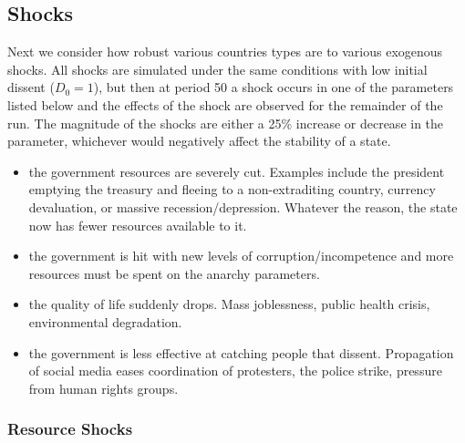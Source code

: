 \documentclass[12pt]{article}
\begin{document}
\begin{spacing}{1.5}

\subsection{Shocks}


Next we consider how robust various countries types are to various exogenous shocks. All shocks are simulated under the same conditions with low initial dissent ($D_0 = 1$), but then at period 50 a shock occurs in one of the parameters listed below and the effects of the shock are observed for the remainder of the run. The magnitude of the shocks are either a 25\% increase or decrease in the parameter, whichever would negatively affect the stability of a state.  

\begin{itemize}
	\item {} the government resources are severely cut. Examples include the president emptying the treasury and fleeing to a non-extraditing country, currency devaluation, or massive recession/depression. Whatever the reason, the state now has fewer resources available to it.  
	\item \boldmath{$\Omega,\Phi$:} the government is hit with new levels of corruption/incompetence and more resources must be spent on the anarchy parameters. 
	\item {} the quality of life suddenly drops. Mass joblessness, public health crisis, environmental degradation. 
	\item \boldmath{$\sigma$:} the government is less effective at catching people that dissent. Propagation of social media eases coordination of protesters, the police strike, pressure from human rights groups.     
\end{itemize}

\subsubsection{Resource Shocks} 


\end{spacing}
\end{document}
